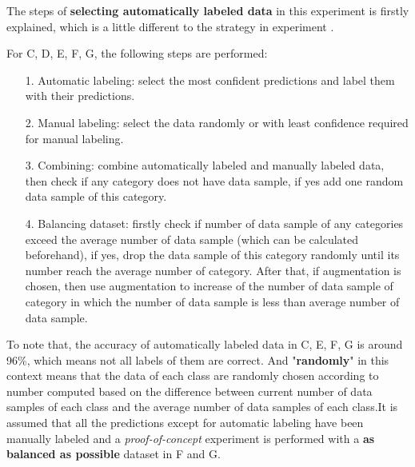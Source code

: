 The steps of \textbf{selecting automatically labeled data} in this experiment is firstly explained, which is a little different to the strategy in experiment . 

For C, D, E, F, G, the following steps are performed:
\begin{itemize}
	\item[1.] Automatic labeling: select the most confident predictions and label them with their predictions.
	\item[2.] Manual labeling: select the data randomly or with least confidence required for manual labeling.
	\item[3.] Combining: combine automatically labeled and manually labeled data, then check if any category does not have data sample, if yes add one random data sample of this category.
	\item[4.] Balancing dataset: firstly check if number of data sample of any categories exceed the average number of data sample (which can be calculated beforehand), if yes, drop the data sample of this category randomly until its number reach the average number of category. After that, if augmentation is chosen, then use augmentation to increase of the number of data sample of category in which the number of data sample is less than average number of data sample.

\end{itemize}
To note that, the accuracy of automatically labeled data in C, E, F, G is around 96\%, which means not all labels of them are correct. And "\textbf{randomly}" in this context means that the data of each class are randomly chosen according to number computed based on the difference between current number of data samples of each class and the average number of data samples of each class.It is assumed that all the predictions except for automatic labeling have been manually labeled and a \textit{proof-of-concept} experiment is performed with a \textbf{as balanced as possible} dataset in F and G.    

